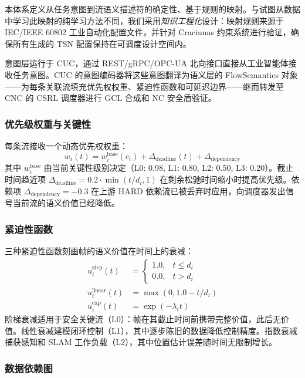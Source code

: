 \documentclass[UTF8]{ctexart}
\begin{document}
本体系定义从任务意图到流语义描述符的确定性、基于规则的映射。与试图从数据中学习此映射的纯学习方法不同，我们采用\textit{知识工程化}设计：映射规则来源于 IEC/IEEE 60802 工业自动化配置文件，并针对 Craciunas 约束系统进行验证，确保所有生成的 TSN 配置保持在可调度设计空间内。

意图层运行于 CUC，通过 REST/gRPC/OPC-UA 北向接口直接从工业智能体接收任务意图。CUC 的意图编码器将这些意图翻译为语义层的 FlowSemantics 对象——为每条关联流填充优先权权重、紧迫性函数和可延迟边界——继而转发至 CNC 的 CSRL 调度器进行 GCL 合成和 NC 安全盾验证。

\subsubsection{优先级权重与关键性}

每条流接收一个动态优先权权重：
\begin{equation}
w_i(t) = w_i^{\text{base}}(c_i) + \Delta_{\text{deadline}}(t) + \Delta_{\text{dependency}}
\end{equation}
其中 $w_i^{\text{base}}$ 由当前关键性级别决定（L0: 0.98, L1: 0.80, L2: 0.50, L3: 0.20）。截止时间趋近项 $\Delta_{\text{deadline}} = 0.2 \cdot \min(t / d_i, 1)$ 在剩余松驰时间缩小时提高优先级。依赖项 $\Delta_{\text{dependency}} = -0.3$ 在上游 HARD 依赖流已被丢弃时应用，向调度器发出信号当前流的语义价值已经降低。

\subsubsection{紧迫性函数}

三种紧迫性函数刻画帧的语义价值在时间上的衰减：
\begin{align}
u_i^{\text{step}}(t) &= \begin{cases} 1.0, & t \leq d_i \\ 0.0, & t > d_i \end{cases} \label{eq:urg_step} \\
u_i^{\text{linear}}(t) &= \max(0, 1.0 - t/d_i) \label{eq:urg_linear} \\
u_i^{\text{exp}}(t) &= \exp(-\lambda_i t) \label{eq:urg_exp}
\end{align}
阶梯衰减适用于安全关键流（L0）：帧在其截止时间前携带完整价值，此后无价值。线性衰减建模闭环控制（L1），其中逐步陈旧的数据降低控制精度。指数衰减捕获感知和 SLAM 工作负载（L2），其中位置估计误差随时间无限制增长。

\subsubsection{数据依赖图}
\end{document}
